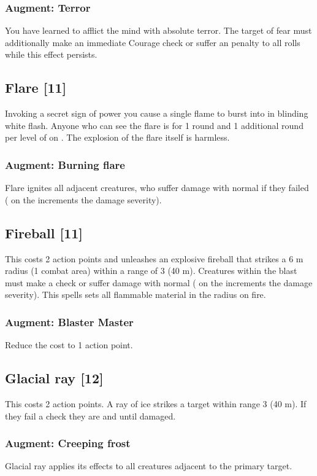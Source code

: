 \subsubsection{Augment: Terror}
You have learned to afflict the mind with absolute terror. The target of fear must additionally make an immediate Courage check or suffer an  penalty to all rolls while this effect persists. 

\subsection{Flare [11]}
\label{spell:flare}
Invoking a secret sign of power you cause a single flame to burst into in blinding white flash. Anyone who can see the flare is  for 1 round and 1 additional round per level of  on . The explosion of the flare itself is harmless.
\subsubsection{Augment: Burning flare}
Flare ignites all adjacent creatures, who suffer damage with normal  if they failed  ( on the  increments the damage severity).

\subsection{Fireball [11]}
This costs 2 action points and unleashes an explosive fireball that strikes a 6 m radius (1 combat area) within a range of 3 (40 m). Creatures within the blast must make a  check or suffer damage with normal  ( on the  increments the damage severity). This spells sets all flammable material in the radius on fire.
\subsubsection{Augment: Blaster Master}
Reduce the cost to 1 action point.

\subsection{Glacial ray [12]}
This costs 2 action points. A ray of ice strikes a target within range 3 (40 m). If they fail a  check they are  and  until damaged. 
\subsubsection{Augment: Creeping frost}
Glacial ray applies its effects to all creatures adjacent to the primary target.
